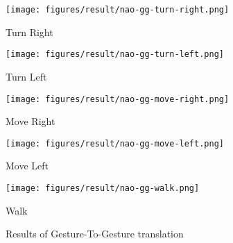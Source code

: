 \begin{figure}
	[h]	 	
	\begin{minipage}
		{.3 
			\textwidth}  		
		\texttt{[image: figures/result/nao-gg-turn-right.png]} \caption*{Turn Right } 
	\end{minipage}
	\begin{minipage}
		{.3 
			\textwidth}  
		
		\texttt{[image: figures/result/nao-gg-turn-left.png]} \caption*{Turn Left }
	\end{minipage}
	\begin{minipage}
		{.3
			\textwidth}  
		
		\texttt{[image: figures/result/nao-gg-move-right.png]} \caption*{Move Right}
	\end{minipage}
	\begin{minipage}
		{.3
			\textwidth}  
		
		\texttt{[image: figures/result/nao-gg-move-left.png]} \caption*{Move Left}
	\end{minipage}
	\begin{minipage}
		{.4
			\textwidth}  
		\centering
		\texttt{[image: figures/result/nao-gg-walk.png]} 
		\caption*{Walk}
	\end{minipage}	
	\caption{Results of Gesture-To-Gesture translation}
	\label{res:gg}
\end{figure}
